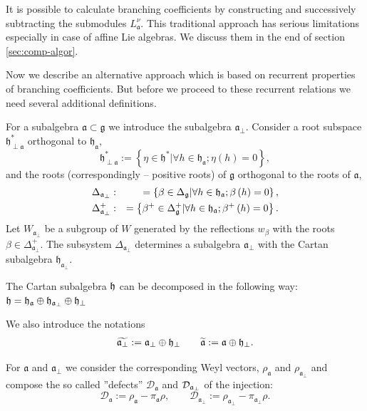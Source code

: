 \documentclass[preprint,12pt]{elsarticle}
\newcommand{\gf}{\mathfrak{g}}
\newcommand{\af}{\mathfrak{a}}
\newcommand{\afb}{\mathfrak{a}_{\bot}}
\newcommand{\hf}{\mathfrak{h}}
\begin{document}
It is possible to calculate branching coefficients by constructing and successively  subtracting the submodules $L^{\nu}_{\af}$. 
This traditional approach has serious limitations especially in case of affine Lie algebras. We discuss them in the end of section \ref{sec:comp-algor}. 

Now we describe an alternative approach which is based on recurrent properties of branching coefficients. 
But before we proceed to these recurrent relations we need several additional definitions.

For a subalgebra $\af\subset \gf$ we introduce the subalgebra
$\afb$. Consider a root subspace $\hf_{\perp \af}^{\ast }$
orthogonal to $\hf_{\af}$,
\begin{equation*}
\hf_{\perp \af}^{\ast }:=\left\{ \eta \in \hf^{\ast }|\forall
h\in \hf_{\af};\eta \left( h\right) =0\right\} ,
\end{equation*}
and the roots (correspondingly -- positive roots) of $\gf$ orthogonal
to the roots of $\af$,
\begin{eqnarray}
\Delta _{\afb} &:&=\left\{ \beta \in \Delta _{\gf}|\forall
h\in \hf_{\af};\beta \left( h\right) =0\right\} ,
\label{delta a ort} \\
\Delta _{\afb}^{+} &:&=\left\{ \beta ^{+}\in \Delta _{\gf%
}^{+}|\forall h\in \hf_{\af};\beta ^{+}\left( h\right) =0\right\} .
\notag
\end{eqnarray}
Let $W_{\afb}$ be a subgroup of $W$ generated by
the reflections $w_{\beta }$ with the roots $\beta \in \Delta _{\af_{\perp
}}^{+}$. The subsystem $\Delta _{\afb}$ determines a 
subalgebra $\afb$ with the Cartan subalgebra $\hf_{\af%
_{\perp }}$.

The Cartan subalgebra $\frak{h}$ can be decomposed in the following way:  $\frak{h}=\frak{\frak{h}_{\af}}\oplus
\frak{h}_{\afb}\oplus \frak{h}_{\perp }$

We also introduce the notations
\begin{eqnarray}
\widetilde{\frak{a}_{\perp }} :=\frak{a}_{\perp }\oplus \frak{h}_{\perp }
\qquad
\widetilde{\frak{a}} :=\frak{a}\oplus \frak{h}_{\perp }.
\end{eqnarray}

For $\af$ and $\afb$ we consider the
corresponding Weyl vectors, $\rho _{\af}$ and $\rho _{\af_{\perp
}} $ and compose the so called ''defects'' $\mathcal{D}_{\af}$ and $\mathcal{%
D}_{\afb}$ of the injection:
\begin{equation}
\mathcal{D}_{\af}:=\rho _{\af}-\pi _{\af}\rho , \qquad
\mathcal{D}_{\afb}:=\rho _{\afb}-\pi _{\af%
_{\perp }}\rho .  \label{defect-ort}
\end{equation}
\end{document}
